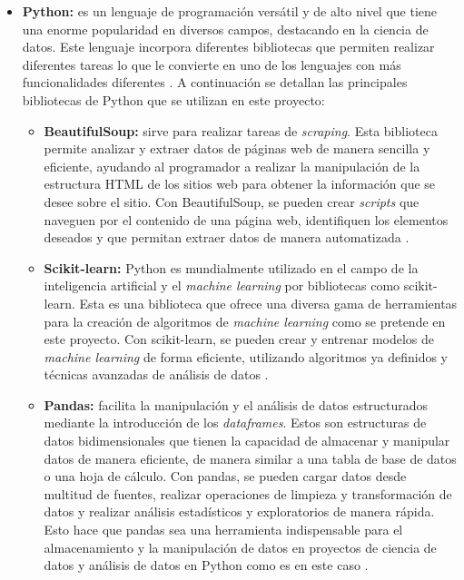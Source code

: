 \begin{itemize}
  \item \textbf{Python:}
   es un lenguaje de programación versátil y de alto nivel que tiene una enorme popularidad en diversos campos, destacando en la ciencia de datos. Este lenguaje incorpora diferentes bibliotecas que permiten realizar diferentes tareas lo que le convierte en uno de los lenguajes con más funcionalidades diferentes \cite{python}. A continuación se detallan las principales bibliotecas de Python que se utilizan en este proyecto:
   \begin{itemize}
    \item \textbf{BeautifulSoup:} sirve para realizar tareas de \textit{scraping}. Esta biblioteca permite analizar y extraer datos de páginas web de manera sencilla y eficiente, ayudando al programador a realizar la manipulación de la estructura HTML de los sitios web para obtener la información que se desee sobre el sitio. Con BeautifulSoup, se pueden crear \textit{scripts} que naveguen por el contenido de una página web, identifiquen los elementos deseados y que permitan extraer datos de manera automatizada \cite{beautifulsoup}.
    \item \textbf{Scikit-learn:} Python es mundialmente utilizado en el campo de la inteligencia artificial y el \textit{machine learning} por bibliotecas como scikit-learn. Esta es una biblioteca que ofrece una diversa gama de herramientas para la creación de algoritmos de \textit{machine learning} como se pretende en este proyecto. Con scikit-learn, se pueden crear y entrenar modelos de \textit{machine learning} de forma eficiente, utilizando algoritmos ya definidos y técnicas avanzadas de análisis de datos \cite{scikit}.
    \item \textbf{Pandas:} facilita la manipulación y el análisis de datos estructurados mediante la introducción de los \textit{dataframes}. Estos son estructuras de datos bidimensionales que tienen la capacidad de almacenar y manipular datos de manera eficiente, de manera similar a una tabla de base de datos o una hoja de cálculo. Con pandas, se pueden cargar datos desde multitud de fuentes, realizar operaciones de limpieza y transformación de datos y realizar análisis estadísticos y exploratorios de manera rápida. Esto hace que pandas sea una herramienta indispensable para el almacenamiento y la manipulación de datos en proyectos de ciencia de datos y análisis de datos en Python como es en este caso \cite{pandas}.
   \end{itemize}
  

\end{itemize}
